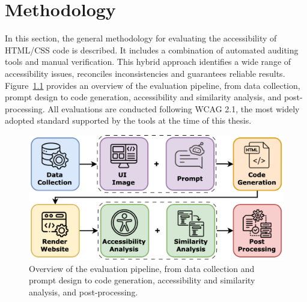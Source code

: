 \chapter{Methodology}
\label{chapter:Methodology}

In this section, the general methodology for evaluating the 
accessibility of HTML/CSS code is described. It includes a combination
of automated auditing tools and manual verification. This hybrid approach 
identifies a wide range of accessibility issues, reconciles inconsistencies and guarantees reliable results. 
Figure~\ref{fig:pipeline} provides an overview of the evaluation pipeline, 
from data collection, prompt design to code generation, accessibility and similarity analysis,
and post-processing.
All evaluations are conducted following WCAG 2.1, the most widely 
adopted standard supported by the tools at the time of this thesis.

\begin{figure}[htbp]
  \centering
  \includegraphics[width=0.5\linewidth]{figures/pipeline_modern.png}
  \caption{Overview of the evaluation pipeline, from data collection and prompt design to code generation, accessibility and similarity analysis, and post-processing.}
  \label{fig:pipeline} 
\end{figure}

